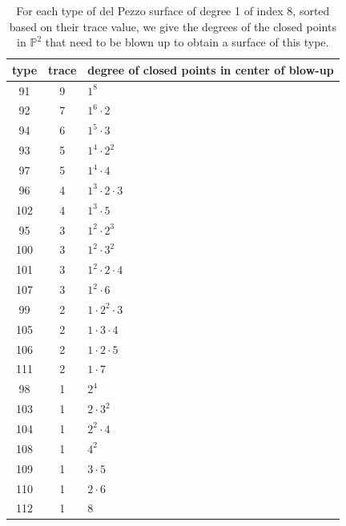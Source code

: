 \documentclass[a4paper, 11pt, reqno]{amsart}
\numberwithin{equation}{section} \numberwithin{figure}{section}
\def \P {{\mathbb P}}
\theoremstyle{definition}
\numberwithin{lemma}{section}
\begin{document}
\begin{table}[ht]
    \centering
    \caption{For each type of del Pezzo surface of degree 1 of index 8, sorted based on their trace value, we give the degrees of the closed points in $\P^2$ that need to be blown up to obtain a surface of this type.}
    \begin{tabular}{|c|c|l|}
    \hline
    type & trace & degree of closed points in center of blow-up\\
    \hline
    \hline
    91 & 9 & $1^8$ \\
    \hline
    92 & 7 & $1^6\cdot 2$\\
    \hline
    94 & 6 & $1^5 \cdot 3$\\
    \hline
    93 & 5 & $1^4 \cdot 2^2$\\
    97 & 5 & $1^4 \cdot 4$\\
    \hline
    96 & 4 & $1^3 \cdot 2 \cdot 3$\\
    102& 4 & $1^3 \cdot 5$ \\
    \hline
    95 & 3 & $1^2 \cdot 2^3$\\
    100 & 3 & $1^2 \cdot 3^2$\\
    101 & 3 & $1^2 \cdot 2 \cdot 4$\\
    107 & 3 & $1^2 \cdot 6$\\
    \hline
    99 & 2 & $1 \cdot 2^2 \cdot 3$\\
    105 & 2 & $1 \cdot 3 \cdot 4$\\
    106 & 2 & $1 \cdot 2 \cdot 5$\\
    111 & 2 & $1 \cdot 7$\\
    \hline
    98 & 1 & $2^4$\\
    103 & 1 & $2 \cdot 3^2$\\
    104 & 1 & $2^2 \cdot 4$\\
    108 & 1 & $4^2$\\
    109 & 1 & $3 \cdot 5$\\
    110 & 1 & $2 \cdot 6$\\
    112 & 1 & $8$\\
    \hline
\end{tabular}
    \label{tab:blowupindex8}
\end{table}
\end{document}
